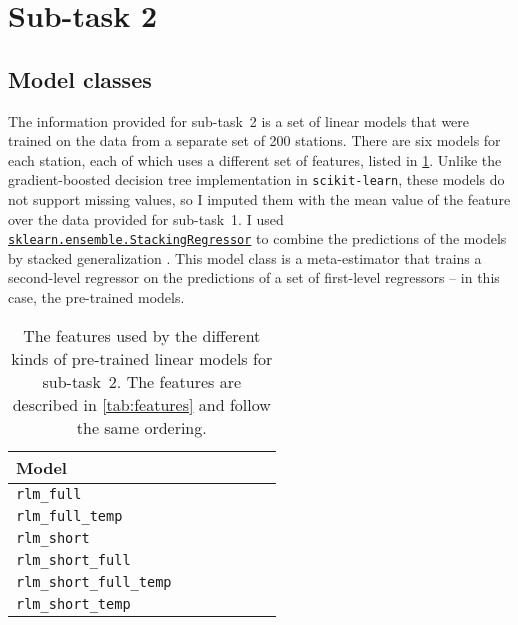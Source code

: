 \documentclass[11pt]{extarticle}
\newcommand{\bikesavgfull}{\texttt{bikes\_avg\_full}}
\newcommand{\bikesavgshort}{\texttt{bikes\_avg\_short}}
\newcommand{\bikesh}{\texttt{bikes\_3h}}
\newcommand{\bikeshdiffavgfull}{\texttt{bikes\_3h\_diff\_avg\_full}}
\newcommand{\bikeshdiffavgshort}{\texttt{bikes\_3h\_diff\_avg\_short}}
\newcommand{\rlmfull}{\texttt{rlm\_full}}
\newcommand{\rlmfulltemp}{\texttt{rlm\_full\_temp}}
\newcommand{\rlmshort}{\texttt{rlm\_short}}
\newcommand{\rlmshortfull}{\texttt{rlm\_short\_full}}
\newcommand{\rlmshortfulltemp}{\texttt{rlm\_short\_full\_temp}}
\newcommand{\rlmshorttemp}{\texttt{rlm\_short\_temp}}
\newcommand{\sklearn}[2]{\href{https://scikit-learn.org/stable/modules/generated/sklearn.#1.#2.html}{\lstinline|sklearn.#1.#2|}}
\begin{document}
\section{Sub-task 2}
\label{sec:subtask-2}

\subsection{Model classes}
\label{sec:subtask-2:model-classes}

The information provided for sub-task~2 is a set of linear models that were trained on
the data from a separate set of 200 stations.
There are six models for each station, each of which uses a different set of features,
listed in \cref{tab:2:features}.
Unlike the gradient-boosted decision tree implementation in \texttt{scikit-learn},
these models do not support missing values, so I imputed them with the mean value of
the feature over the data provided for sub-task~1.
I used \sklearn{ensemble}{StackingRegressor} to combine the predictions of the models
by stacked generalization \parencite{Wolpert1992}.
This model class is a meta-estimator that trains a second-level regressor on the
predictions of a set of first-level regressors -- in this case, the pre-trained models.

\begin{table}
  \centering
  \newcommand{\rlmtablerow}[7]{#1 & #7 & #2 & #3 & #4 & #5 & #6 \\}
  \begin{tabular}{lllllll}

    \rlmtablerow{Model}{\rot{\bikesh{}}}{\rot{\bikesavgfull{}}}{\rot{\bikesavgshort{}}}{\rot{\bikeshdiffavgfull{}}}{\rot{\bikeshdiffavgshort{}}}{\rot{\texttt{temperature}}}

    \midrule

    \rlmtablerow{\rlmfull{}}{\checkmark}{\checkmark}{}{\checkmark}{}{}

    \rlmtablerow{\rlmfulltemp{}}{\checkmark}{\checkmark}{}{\checkmark}{}{\checkmark}

    \rlmtablerow{\rlmshort{}}{\checkmark}{}{\checkmark}{}{\checkmark}{}

    \rlmtablerow{\rlmshortfull{}}{\checkmark}{\checkmark}{\checkmark}{\checkmark}{\checkmark}{}

    \rlmtablerow{\rlmshortfulltemp{}}{\checkmark}{\checkmark}{\checkmark}{\checkmark}{\checkmark}{\checkmark}

    \rlmtablerow{\rlmshorttemp{}}{\checkmark}{}{\checkmark}{}{\checkmark}{\checkmark}

    \bottomrule
  \end{tabular}
  \caption{The features used by the different kinds of pre-trained linear
    models for sub-task~2.
    The features are described in \cref{tab:features} and follow the same ordering.
  }
  \label{tab:2:features}
\end{table}
\end{document}
